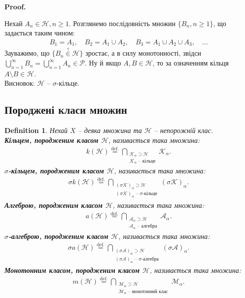 \documentclass[a4paper, 10pt]{article}
\makeatletter
\theoremstyle{theoremdd}
\newtheorem{definition}[theorem]{Definition}
\renewenvironment{proof}[1][Proof.\\]{\par
\pushQED{\hfill \qed}%
\normalfont \topsep6\p@\@plus6\p@\relax
\trivlist
\item\relax
{\bfseries
#1\@addpunct{.}}\hspace\labelsep\ignorespaces
}{%
\popQED\endtrivlist\@endpefalse
}
\makeatother
\begin{document}
\begin{proof}
Нехай $A_n \in \mathcal{H}, n \geq 1$. Розглянемо послідовність множин $\{B_n, n \geq 1\}$, що задається таким чином:
\begin{align*}
B_1 = A_1,\quad B_2 = A_1 \cup A_2,\quad  B_3 = A_1 \cup A_2 \cup A_3, \quad \dots
\end{align*}
Зауважимо, що $\{B_n \overset{!}{\in} \mathcal{H}\}$ зростає, а в силу монотонності, звідси $\displaystyle\bigcup_{n=1}^\infty B_n = \bigcup_{n=1}^\infty A_n \in \mathcal{P}$. Ну й якщо $A,B \in \mathcal{H}$, то за означенням кільця $A \setminus B \in \mathcal{H}$.\\
Висновок: $\mathcal{H}$ -- $\sigma$-кільце.
\end{proof}

\subsection{Породжені класи множин}
\begin{definition}
Нехай $X$ -- деяка множина та $\mathcal{H}$ -- непорожній клас.\\
\textbf{Кільцем, породженим класом $\mathcal{H}$}, називається така множина:
\begin{align*}
k(\mathcal{H}) \overset{\text{def.}}{=} \bigcap_{\substack{\mathcal{K}_\alpha \supset \mathcal{H} \\ \mathcal{K}_\alpha \text{ -- кільце}}} \mathcal{K}_\alpha.
\end{align*}
\textbf{$\sigma$-кільцем, породженим класом $\mathcal{H}$}, називається така множина:
\begin{align*}
\sigma k(\mathcal{H}) \overset{\text{def.}}{=} \bigcap_{\substack{(\sigma\mathcal{K})_\alpha \supset \mathcal{H} \\ (\sigma\mathcal{K})_\alpha \text{ -- $\sigma$-кільце}}} (\sigma\mathcal{K})_\alpha.
\end{align*}
\textbf{Алгеброю, породженим класом $\mathcal{H}$}, називається така множина:
\begin{align*}
a(\mathcal{H}) \overset{\text{def.}}{=} \bigcap_{\substack{\mathcal{A}_\alpha \supset \mathcal{H} \\ \mathcal{A}_\alpha \text{ -- алгебра}}} \mathcal{A}_\alpha.
\end{align*}
\textbf{$\sigma$-алгеброю, породженим класом $\mathcal{H}$}, називається така множина:
\begin{align*}
\sigma a(\mathcal{H}) \overset{\text{def.}}{=} \bigcap_{\substack{(\sigma\mathcal{A})_\alpha \supset \mathcal{H} \\ (\sigma\mathcal{A})_\alpha \text{ -- $\sigma$-алгебра}}} (\sigma\mathcal{A})_\alpha.
\end{align*}
\textbf{Монотонним класом, породженим класом $\mathcal{H}$}, називається така множина:
\begin{align*}
m(\mathcal{H}) \overset{\text{def.}}{=} \bigcap_{\substack{\mathcal{M}_\alpha \supset \mathcal{H} \\ \mathcal{M}_\alpha \text{ -- монотонний клас}}} \mathcal{M}_\alpha.
\end{align*}
\end{definition}
\end{document}
